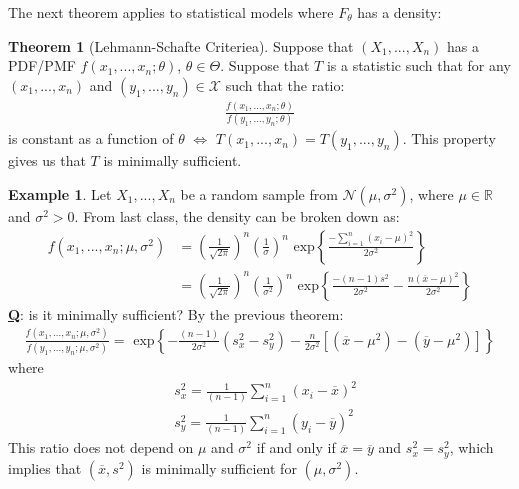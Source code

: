 \documentclass[11pt]{scrartcl}
\newcommand{\R}[0]{\mathbb{R}}
\theoremstyle{definition}
\newtheorem{theorem}{Theorem}
\newtheorem{ex}{Example}
\theoremstyle{remark}
\begin{document}
{ The next theorem applies to statistical models where $F_\theta$ has a density: 
 \begin{theorem}[Lehmann-Schafte Criteriea] 
 	Suppose that $(X_1, ..., X_n)$ has a PDF/PMF $f(x_1, ..., x_n; \theta)$, $\theta \in \Theta$. Suppose that $T$ is a statistic such that for any $(x_1, ..., x_n)$ and $(y_1, ... , y_n) \in \mathcal{X}$ such that the ratio: 
 	\begin{align*}
 		\frac{f(x_1, ..., x_n; \theta)}{f(y_1, ..., y_n; \theta)}
 	\end{align*}
 	is constant as a function of $\theta$ $\iff$ $T(x_1, ..., x_n) = T(y_1, ..., y_n)$. This property gives us that $T$ is minimally sufficient. 
 \end{theorem}
 
 \begin{ex}
 	Let $X_1, ..., X_n$ be a random sample from $\mathcal{N}(\mu, \sigma^2)$, where $\mu \in \R$ and $\sigma^2 > 0$. From last class, the density can be broken down as: 
 	\begin{align*}
 		f(x_1, ..., x_n; \mu, \sigma^2) & = \left( \frac{1}{\sqrt{2 \pi}} \right)^n \left( \frac{1}{ \sigma} \right)^n \text{ exp} \left\{ \frac{- \sum_{i=1}^n (x_i - \mu)^2}{2 \sigma^2} \right\}  \\
 		& = \left( \frac{1}{\sqrt{ 2 \pi}} \right)^n \left(  \frac{1}{\sigma^2} \right)^n \text{ exp} \left\{ \frac{-(n-1)s^2}{2 \sigma^2} - \frac{n(\overline{x} - \mu)^2}{2 \sigma^2} \right\} 
 	\end{align*}	
 	\textbf{\underline{Q}}: is it minimally sufficient? By the previous theorem: 
 	\begin{align*}
 		\frac{f(x_1, ..., x_n; \mu, \sigma^2)}{f(y_1, ..., y_n; \mu, \sigma^2)} = \text{ exp} \left\{  - \frac{(n-1)}{2 \sigma^2} (s_x^2 - s_y^2) - \frac{n}{2 \sigma^2} \left[  (\overline{x} - \mu^2 ) - (\overline{y} - \mu^2)	\right]			\right\}
 	\end{align*}
 	where
 	\begin{align*}
 		& s_x^2 = \frac{1}{(n-1)} \sum_{i=1}^n (x_i - \overline{x})^2 \\
 		& s_y^2 = \frac{1}{(n-1)} \sum_{i=1}^n (y_i - \overline{y})^2
 	\end{align*}
 	This ratio does not depend on $\mu$ and $\sigma^2$ if and only if $\overline{x} = \overline{y}$ and $s_x^2 = s_y^2$, which implies that $(\overline{x}, s^2)$ is minimally sufficient for $(\mu, \sigma^2)$. 
 \end{ex}
 
}
\end{document}
